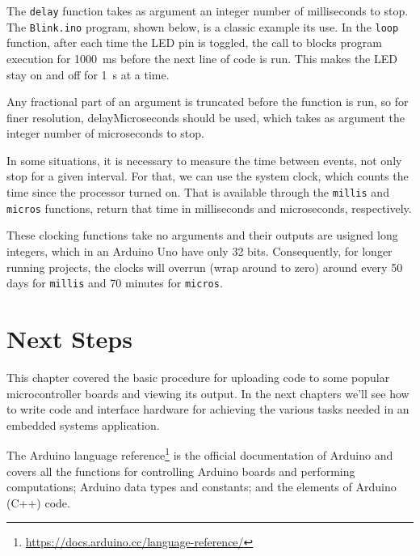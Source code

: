 The \texttt{delay} function takes as argument an integer number of milliseconds to stop.
The \texttt{Blink.ino} program, shown below, is a classic example its use.
In the \texttt{loop} function, after each time the LED pin is toggled, the call to  blocks program execution for \SI{1000}{ms} before the next line of code is run.
This makes the LED stay on and off for \SI{1}{s} at a time.


Any fractional part of an argument is truncated before the function is run, so for finer resolution, {delayMicroseconds} should be used, which takes as argument the integer number of microseconds to stop.

In some situations, it is necessary to measure the time between events, not only stop for a given interval.
For that, we can use the system clock, which counts the time since the processor turned on.
That is available through the \texttt{millis} and \texttt{micros} functions, return that time in milliseconds and microseconds, respectively.

These clocking functions take no arguments and their outputs are usigned long integers, which in an Arduino Uno have only 32 bits.
Consequently, for longer running projects, the clocks will overrun (wrap around to zero) around every 50 days for \texttt{millis} and 70 minutes for \texttt{micros}.


\section{Next Steps}

This chapter covered the basic procedure for uploading code to some popular microcontroller boards and viewing its output.
In the next chapters we'll see how to write code and interface hardware for achieving the various tasks needed in an embedded systems application.

The Arduino language reference\footnote{\url{https://docs.arduino.cc/language-reference/}} is the official documentation of Arduino and covers all the functions for controlling Arduino boards and performing computations; Arduino data types and constants; and the elements of Arduino (C++) code.

